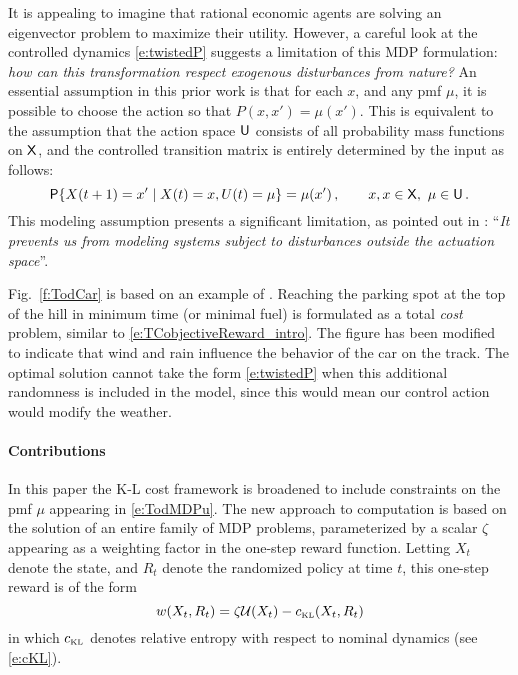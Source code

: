 \documentclass[final,12pt]{colt2018} %
\def\util{{\mathcal{U}}}
\def\cKL{c_{\text{\tiny KL}}}
\def\reward{w}
\def\U{{\sf U}}
\def\state{{\sf X}}
\def\Prob{{\sf P}}
\def\Fig#1{Fig.~\ref{#1}}
\begin{document}
It is appealing to imagine that rational economic agents are solving an eigenvector problem to maximize their utility.  However, a careful look at the controlled dynamics \eqref{e:twistedP} suggests a limitation of this MDP formulation:  \textit{how can this transformation respect exogenous disturbances from nature?}  
An essential assumption in this prior work is that for each $x$,  and any pmf $\mu$,  it is possible to choose the action so that $P(x,x') = \mu(x')$.  This is equivalent to the assumption that  the action space 
$\U$ consists of all probability mass functions on $\state$, and the controlled transition matrix is entirely determined by the input as follows:
\begin{equation}
\Prob\{X(t+1)=x'\mid X(t) =x, U(t) = \mu\} = \mu(x')\,,\qquad x,x\in\state,\ \mu\in\U\, .
\label{e:TodMDPu}
\end{equation}
This modeling assumption presents a significant limitation, as pointed out in \cite{tod09}:  ``\textit{It prevents us from modeling systems subject to disturbances outside the actuation space}''.


 
 
\Fig{f:TodCar} is based on an example of \cite{tod09}.  Reaching the parking spot at the top of the hill in minimum time (or  minimal fuel) is formulated as a total \textit{cost} problem, similar to \eqref{e:TCobjectiveReward_intro}.   
The figure has been modified to indicate that wind and rain influence the behavior of the car on the track.    The optimal solution cannot take the form \eqref{e:twistedP} when this additional randomness is included in the model, since this would mean our control action would modify the weather.  





\paragraph{Contributions}

In this paper the K-L cost framework is broadened to include constraints on the pmf $\mu$ appearing in \eqref{e:TodMDPu}.  
The new approach to computation   is based on the solution of an entire family of MDP problems,  parameterized by a scalar $\zeta$ appearing as a weighting factor in the one-step reward function.  Letting $X_t$ denote the state, and $R_t$ denote the randomized policy at time $t$, this one-step reward is of the form
\begin{equation}
\reward(X_t,R_t) = \zeta \util(X_t) -  \cKL(X_t,R_t ) 
\label{e:oneStepReward}
\end{equation}
in which $\cKL$ denotes relative entropy with respect to nominal dynamics (see \eqref{e:cKL}).   
\end{document}
